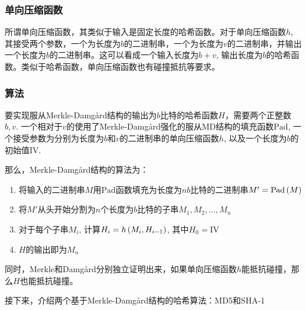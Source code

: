 \subsubsection{单向压缩函数}
所谓单向压缩函数，其类似于输入是固定长度的哈希函数。对于单向压缩函数$h$, 其接受两个参数，一个为长度为$b$的二进制串，一个为长度为$v$的二进制串，并输出一个长度为$b$的二进制串。这可以看成一个输入长度为$b+v$, 输出长度为$b$的哈希函数。类似于哈希函数，单向压缩函数也有碰撞抵抗等要求。
\subsubsection{算法}
要实现服从Merkle-Damg\aa rd结构的输出为$b$比特的哈希函数$H$，需要两个正整数$b, v$. 一个相对于$v$的使用了Merkle-Damg\aa rd强化的服从MD结构的填充函数$\mathrm{Pad}$, 一个接受参数为分别为长度为$b$和$v$的二进制串的单向压缩函数$h$, 以及一个长度为$b$的初始值$\mathrm{IV}$.\par
那么，Merkle-Damg\aa rd结构的算法为：
\begin{enumerate}
	\item 将输入的二进制串$M$用$\mathrm{Pad}$函数填充为长度为$nb$比特的二进制串$M'=\mathrm{Pad}\left( {M}\right)$
	\item 将$M'$从头开始分割为$n$个长度为$b$比特的子串$M_1, M_2, \ldots, M_n$
	\item 对于每个子串$M_i$, 计算$H_i=h\left( {M_i, H_{i-1}}\right)$, 其中$H_0=\mathrm{IV}$
	\item $H$的输出即为$M_n$
\end{enumerate}

同时，Merkle和Damg\aa rd分别独立证明出来，如果单向压缩函数$h$能抵抗碰撞，那么$H$也能抵抗碰撞。\par
接下来，介绍两个基于Merkle-Damg\aa rd结构的哈希算法：MD5和SHA-1
